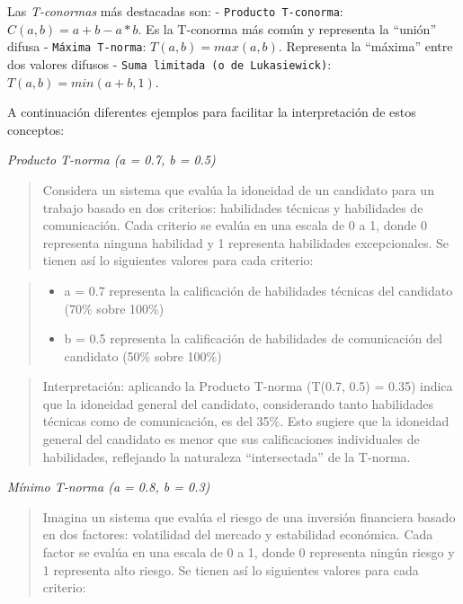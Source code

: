 \documentclass[
  a4paper,
  DIV=11,
  numbers=noendperiod]{scrreprt}
\providecommand{\tightlist}{%
  \setlength{\itemsep}{0pt}\setlength{\parskip}{0pt}}\usepackage{longtable,booktabs,array}
\begin{document}
Las \emph{T-conormas} más destacadas son: -
\texttt{Producto\ T-conorma}: \(C(a, b) = a + b - a * b\). Es la
T-conorma más común y representa la ``unión'' difusa -
\texttt{Máxima\ T-norma}: \(T(a, b) = max(a, b)\). Representa la
``máxima'' entre dos valores difusos -
\texttt{Suma\ limitada\ (o\ de\ Lukasiewick)}:
\(T(a, b) = min(a + b, 1)\).

A continuación diferentes ejemplos para facilitar la interpretación de
estos conceptos:

\emph{Producto T-norma (a = 0.7, b = 0.5)}

\begin{quote}
Considera un sistema que evalúa la idoneidad de un candidato para un
trabajo basado en dos criterios: habilidades técnicas y habilidades de
comunicación. Cada criterio se evalúa en una escala de 0 a 1, donde 0
representa ninguna habilidad y 1 representa habilidades excepcionales.
Se tienen así lo siguientes valores para cada criterio:
\end{quote}

\begin{quote}
\begin{itemize}
\tightlist
\item
  a = 0.7 representa la calificación de habilidades técnicas del
  candidato (70\% sobre 100\%)
\item
  b = 0.5 representa la calificación de habilidades de comunicación del
  candidato (50\% sobre 100\%)
\end{itemize}
\end{quote}

\begin{quote}
Interpretación: aplicando la Producto T-norma (T(0.7, 0.5) = 0.35)
indica que la idoneidad general del candidato, considerando tanto
habilidades técnicas como de comunicación, es del 35\%. Esto sugiere que
la idoneidad general del candidato es menor que sus calificaciones
individuales de habilidades, reflejando la naturaleza ``intersectada''
de la T-norma.
\end{quote}

\emph{Mínimo T-norma (a = 0.8, b = 0.3)}

\begin{quote}
Imagina un sistema que evalúa el riesgo de una inversión financiera
basado en dos factores: volatilidad del mercado y estabilidad económica.
Cada factor se evalúa en una escala de 0 a 1, donde 0 representa ningún
riesgo y 1 representa alto riesgo. Se tienen así lo siguientes valores
para cada criterio:
\end{quote}
\end{document}
